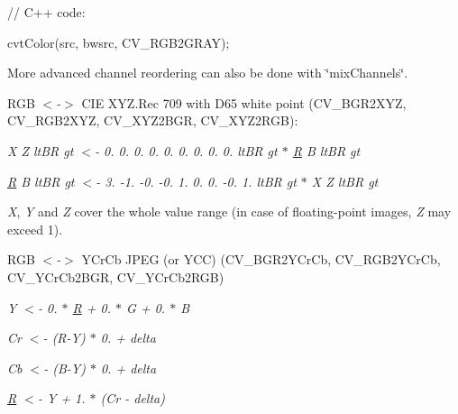 {\ttfamily }

{\ttfamily // C++ code\+:}

{\ttfamily }

{\ttfamily }

{\ttfamily cvt\+Color(src, bwsrc, C\+V\+\_\+\+R\+G\+B2\+G\+R\+A\+Y);}

{\ttfamily }

{\ttfamily }

{\ttfamily }

More advanced channel reordering can also be done with \char`\"{}mix\+Channels\char`\"{}.


\begin{DoxyItemize}
\item R\+GB {\itshape $<$-\/$>$} C\+IE X\+Y\+Z.\+Rec 709 with D65 white point ({\ttfamily C\+V\+\_\+\+B\+G\+R2\+X\+YZ, C\+V\+\_\+\+R\+G\+B2\+X\+YZ, C\+V\+\_\+\+X\+Y\+Z2\+B\+GR, C\+V\+\_\+\+X\+Y\+Z2\+R\+GB})\+: 
\end{DoxyItemize}

{\itshape X Z lt\+BR gt $<$-\/ 0. 0. 0. 0. 0. 0. 0. 0. 0. lt\+BR gt $\ast$ \mbox{\hyperlink{classorg_1_1opencv_1_1_r}{R}} B lt\+BR gt}

{\itshape \mbox{\hyperlink{classorg_1_1opencv_1_1_r}{R}} B lt\+BR gt $<$-\/ 3. -\/1. -\/0. -\/0. 1. 0. 0. -\/0. 1. lt\+BR gt $\ast$ X Z lt\+BR gt}

{\itshape X}, {\itshape Y} and {\itshape Z} cover the whole value range (in case of floating-\/point images, {\itshape Z} may exceed 1).


\begin{DoxyItemize}
\item R\+GB {\itshape $<$-\/$>$} Y\+Cr\+Cb J\+P\+EG (or Y\+CC) ({\ttfamily C\+V\+\_\+\+B\+G\+R2\+Y\+Cr\+Cb, C\+V\+\_\+\+R\+G\+B2\+Y\+Cr\+Cb, C\+V\+\_\+\+Y\+Cr\+Cb2\+B\+GR, C\+V\+\_\+\+Y\+Cr\+Cb2\+R\+GB}) 
\end{DoxyItemize}

{\itshape Y $<$-\/ 0. $\ast$ \mbox{\hyperlink{classorg_1_1opencv_1_1_r}{R}} + 0. $\ast$ G + 0. $\ast$ B}

{\itshape Cr $<$-\/ (R-\/Y) $\ast$ 0. + delta}

{\itshape Cb $<$-\/ (B-\/Y) $\ast$ 0. + delta}

{\itshape \mbox{\hyperlink{classorg_1_1opencv_1_1_r}{R}} $<$-\/ Y + 1. $\ast$ (Cr -\/ delta)}

